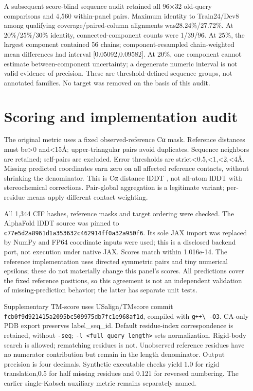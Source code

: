 A subsequent score-blind sequence audit retained all 96×32 old-query comparisons
and 4,560 within-panel pairs. Maximum identity to Train24/Dev8 among qualifying
coverage/paired-column alignments was28.24\%/27.72\%. At 20\%/25\%/30\% identity,
connected-component counts were 1/39/96. At 25\%, the largest component contained 56
chains; component-resampled chain-weighted mean differences had interval
{[}0.05092,0.09582{]}. At 20\%, one component cannot estimate between-component
uncertainty; a degenerate numeric interval is not valid evidence of precision.
These are threshold-defined sequence groups, not annotated families. No target
was removed on the basis of this audit.

\section{Scoring and implementation audit}\label{scoring-and-implementation-audit}

The original metric uses a fixed observed-reference Cα mask. Reference distances
must be\textgreater0 and\textless15Å; upper-triangular pairs avoid duplicates. Sequence neighbors
are retained; self-pairs are excluded. Error thresholds are strict\textless0.5,\textless1,\textless2,\textless4Å.
Missing predicted coordinates earn zero on all affected reference contacts,
without shrinking the denominator. This is Cα distance lDDT \citep{lddt}, not all-atom
lDDT with stereochemical corrections. Pair-global aggregation is a legitimate
variant; per-residue means apply different contact weighting.

All 1,344 CIF hashes, reference masks and target ordering were checked. The
AlphaFold lDDT source was pinned to
\nolinkurl{c77e5d2a8961d1a353632c462914ff0a32a950f6}. Its sole JAX import was replaced by
NumPy and FP64 coordinate inputs were used; this is a disclosed backend port,
not execution under native JAX. Scores match within 1.016e-14. The reference
implementation uses directed symmetric pairs and tiny numerical epsilons;
these do not materially change this panel's scores. All predictions cover the
fixed reference positions, so this agreement is not an independent validation
of missing-prediction behavior; the latter has separate unit tests.

Supplementary TM-score uses USalign/TMscore commit
\nolinkurl{fcb0f9d921415a2095bc509975db7fc1e968af1d}, compiled with \nolinkurl{g++\ -O3}.
CA-only PDB export preserves label\_seq\_id. Default residue-index correspondence
is retained, without \nolinkurl{-seq}; \texttt{-l\ \textless{}full\ query\ length\textgreater{}} sets normalization.
Rigid-body search is allowed; rematching residues is not. Unobserved reference
residues have no numerator contribution but remain in the length denominator.
Output precision is four decimals. Synthetic executable checks yield 1.0 for
rigid translation,0.5 for half missing residues and 0.121 for reversed numbering.
The earlier single-Kabsch auxiliary metric remains separately named.


